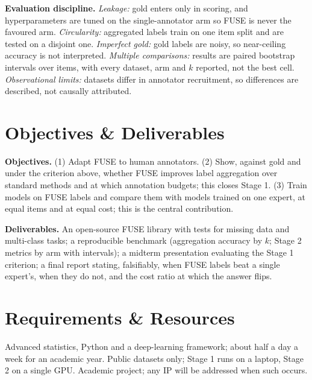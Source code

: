 \documentclass[10pt]{article}
\begin{document}
\textbf{Evaluation discipline.} \emph{Leakage:} gold enters only in scoring, and
hyperparameters are tuned on the single-annotator arm so FUSE is never the favoured arm.
\emph{Circularity:} aggregated labels train on one item split and are tested on a disjoint
one. \emph{Imperfect gold:} gold labels are noisy, so near-ceiling accuracy is not
interpreted. \emph{Multiple comparisons:} results are paired bootstrap intervals over
items, with every dataset, arm and $k$ reported, not the best cell. \emph{Observational
limits:} datasets differ in annotator recruitment, so differences are described, not
causally attributed.

\section*{Objectives \& Deliverables}

\textbf{Objectives.} (1) Adapt FUSE to human annotators. (2) Show, against gold and under
the criterion above, whether FUSE improves label aggregation over standard methods and at
which annotation budgets; this closes Stage 1. (3) Train models on FUSE labels and compare
them with models trained on one expert, at equal items and at equal cost; this is the
central contribution.

\textbf{Deliverables.} An open-source FUSE library with tests for missing data and
multi-class tasks; a reproducible benchmark (aggregation accuracy by $k$; Stage 2 metrics by
arm with intervals); a midterm presentation evaluating the Stage 1 criterion; a final report
stating, falsifiably, when FUSE labels beat a single expert's, when they do not, and the
cost ratio at which the answer flips.

\section*{Requirements \& Resources}

Advanced statistics, Python and a deep-learning framework; about half a day a week for an
academic year. Public datasets only; Stage 1 runs on a laptop, Stage 2 on a single GPU.
Academic project; any IP will be addressed when such occurs.
\end{document}

